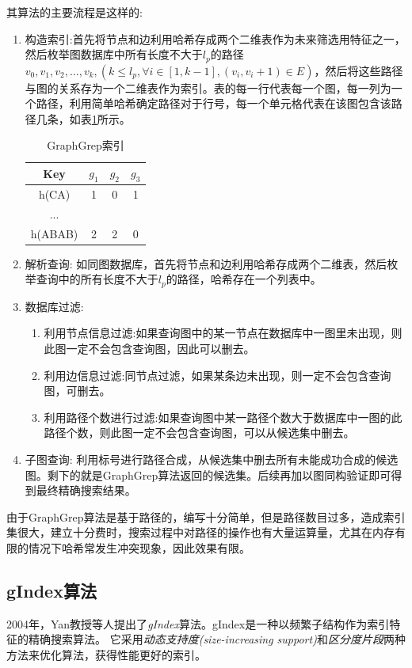 \documentclass{XDBAthesis}
\begin{document}
其算法的主要流程是这样的:
\begin{enumerate}
    \item 构造索引:首先将节点和边利用哈希存成两个二维表作为未来筛选用特征之一，然后枚举图数据库中所有长度不大于$l_p $的路径$v_0 ,v_1 ,v_2 ,...,v_k ,( k\leq l_p ,\forall i\in [1,k-1],(v_i ,v_i+1)\in E) $，然后将这些路径与图的关系存为一个二维表作为索引。表的每一行代表每一个图，每一列为一个路径，利用简单哈希确定路径对于行号，每一个单元格代表在该图包含该路径几条，如表\ref{tb:grepIndex}所示。

\begin{table}[htb]
    \centering
    \begin{tabular}{|c|c|c|c|}
        \hline
        Key&$g_1 $&$g_2 $&$g_3 $ \\ \hline
        h(CA)&1&0&1 \\ \hline
        ...&&&\\ \hline
        h(ABAB)&2&2&0 \\
        \hline
    \end{tabular}
    \caption{GraphGrep索引}
    \label{tb:grepIndex}
\end{table}

    \item 解析查询: 如同图数据库，首先将节点和边利用哈希存成两个二维表，然后枚举查询中的所有长度不大于$l_p $的路径，哈希存在一个列表中。
    \item 数据库过滤: 
        \begin{enumerate}
            \item 利用节点信息过滤:如果查询图中的某一节点在数据库中一图里未出现，则此图一定不会包含查询图，因此可以删去。
            \item 利用边信息过滤:同节点过滤，如果某条边未出现，则一定不会包含查询图，可删去。
            \item 利用路径个数进行过滤:如果查询图中某一路径个数大于数据库中一图的此路径个数，则此图一定不会包含查询图，可以从候选集中删去。
        \end{enumerate}
    \item 子图查询: 利用标号进行路径合成，从候选集中删去所有未能成功合成的候选图。剩下的就是GraphGrep算法返回的候选集。后续再加以图同构验证即可得到最终精确搜索结果。
\end{enumerate}
由于GraphGrep算法是基于路径的，编写十分简单，但是路径数目过多，造成索引集很大，建立十分费时，搜索过程中对路径的操作也有大量运算量，尤其在内存有限的情况下哈希常发生冲突现象，因此效果有限。


\subsection{gIndex算法}
2004年，Yan教授等人提出了\emph{gIndex}算法\cite{gIndex}。gIndex是一种以频繁子结构作为索引特征的精确搜索算法。 它采用\emph{动态支持度(size-increasing support)}和\emph{区分度片段}两种方法来优化算法，获得性能更好的索引。
\end{document}
